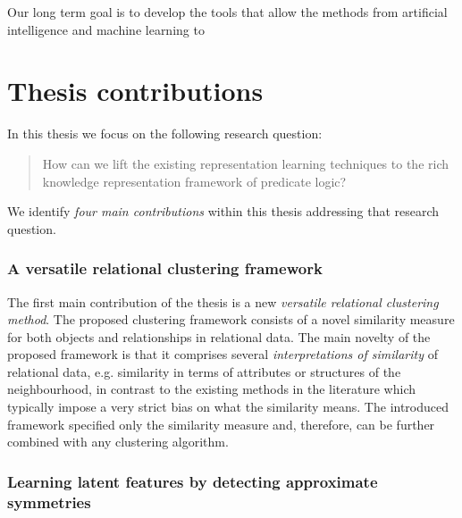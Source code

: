 Our long term goal is to develop the tools that allow the methods from artificial intelligence and machine learning to 










\section{Thesis contributions}

In this thesis we focus on the following research question:

\begin{quote}
	How can we lift the existing representation learning techniques to the rich knowledge representation framework of predicate logic?
\end{quote}


We identify \textit{four main contributions} within this thesis addressing that research question.



\subsubsection{A versatile relational clustering framework}

The first main contribution of the thesis is a new \textit{versatile relational clustering method}.
The proposed clustering framework consists of a novel similarity measure for both objects and relationships in relational data.
The main novelty of the proposed framework is that it comprises several \textit{interpretations of similarity} of relational data, e.g. similarity in terms of attributes or structures of the neighbourhood, in contrast to the existing methods in the literature which typically impose a very strict bias on what the similarity means.
The introduced framework specified only the similarity measure and, therefore, can be further combined with any clustering algorithm.




\subsubsection{Learning latent features by detecting approximate symmetries}

